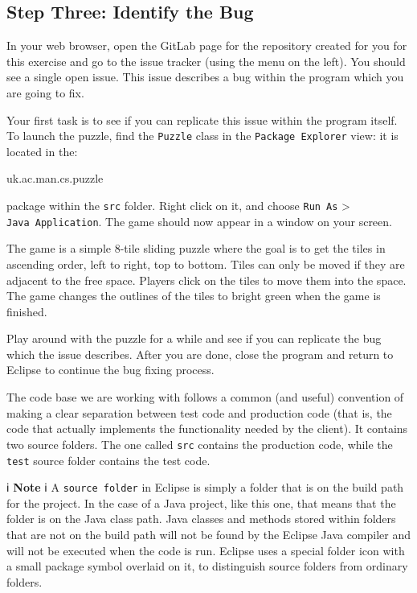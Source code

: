 \documentclass[
]{book}
\newenvironment{Shaded}{\begin{snugshade}}{\end{snugshade}}
\newcommand{\NormalTok}[1]{#1}
\begin{document}
\hypertarget{bugid}{%
\subsection{Step Three: Identify the Bug}\label{bugid}}

In your web browser, open the GitLab page for the repository created for you for this exercise and go to the issue tracker (using the menu on the left). You should see a single open issue. This issue describes a bug within the program which you are going to fix.

Your first task is to see if you can replicate this issue within the program itself. To launch the puzzle, find the \texttt{Puzzle} class in the \texttt{Package\ Explorer} view: it is located in the:

\begin{Shaded}
\begin{Highlighting}[]
\NormalTok{uk.ac.man.cs.puzzle}
\end{Highlighting}
\end{Shaded}

package within the \texttt{src} folder. Right click on it, and choose \texttt{Run\ As} \textgreater{} \texttt{Java\ Application}. The game should now appear in a window on your screen.

The game is a simple 8-tile sliding puzzle where the goal is to get the tiles in ascending order, left to right, top to bottom. Tiles can only be moved if they are adjacent to the free space. Players click on the tiles to move them into the space. The game changes the outlines of the tiles to bright green when the game is finished.

Play around with the puzzle for a while and see if you can replicate the bug which the issue describes. After you are done, close the program and return to Eclipse to continue the bug fixing process.

The code base we are working with follows a common (and useful) convention of making a clear separation between test code and production code (that is, the code that actually implements the functionality needed by the client). It contains two source folders. The one called \texttt{src} contains the production code, while the \texttt{test} source folder contains the test code.

ℹ️ \textbf{Note} ℹ️
A \texttt{source\ folder} in Eclipse is simply a folder that is on the build path for the project. In the case of a Java project, like this one, that means that the folder is on the Java class path. Java classes and methods stored within folders that are not on the build path will not be found by the Eclipse Java compiler and will not be executed when the code is run. Eclipse uses a special folder icon with a small package symbol overlaid on it, to distinguish source folders from ordinary folders.
\end{document}
